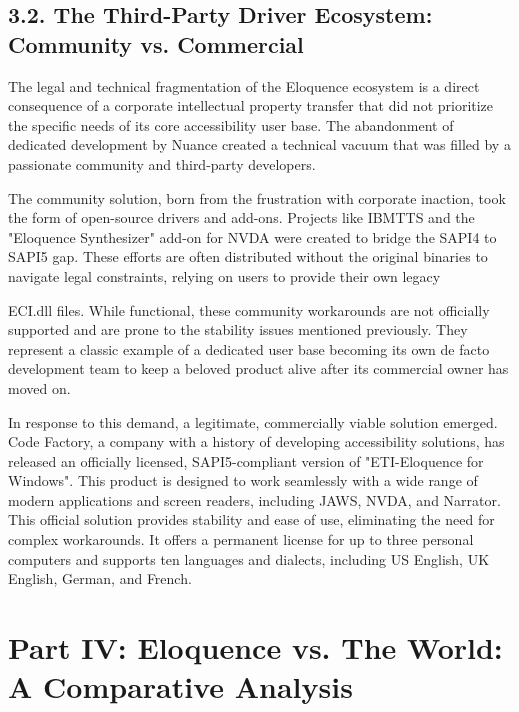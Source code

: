\subsection{3.2. The Third-Party Driver Ecosystem: Community vs. Commercial}
The legal and technical fragmentation of the Eloquence ecosystem is a
direct consequence of a corporate intellectual property transfer that
did not prioritize the specific needs of its core accessibility user
base. The abandonment of dedicated development by Nuance created a
technical vacuum that was filled by a passionate community and
third-party developers.

The community solution, born from the frustration with corporate
inaction, took the form of open-source drivers and add-ons. Projects
like IBMTTS and the "Eloquence Synthesizer" add-on for NVDA were
created to bridge the SAPI4 to SAPI5 gap.\supercite{8} These efforts are often
distributed without the original binaries to navigate legal constraints,
relying on users to provide their own legacy

ECI.dll files.\supercite{14} While functional, these community workarounds are not
officially supported and are prone to the stability issues mentioned
previously. They represent a classic example of a dedicated user base
becoming its own de facto development team to keep a beloved product
alive after its commercial owner has moved on.

In response to this demand, a legitimate, commercially viable solution
emerged. Code Factory, a company with a history of developing
accessibility solutions, has released an officially licensed,
SAPI5-compliant version of "ETI-Eloquence for Windows".\supercite{9} This
product is designed to work seamlessly with a wide range of modern
applications and screen readers, including JAWS, NVDA, and Narrator.\supercite{9}
This official solution provides stability and ease of use, eliminating
the need for complex workarounds. It offers a permanent license for up
to three personal computers and supports ten languages and dialects,
including US English, UK English, German, and French.\supercite{9}

\section{Part IV: Eloquence vs. The World: A Comparative Analysis}
